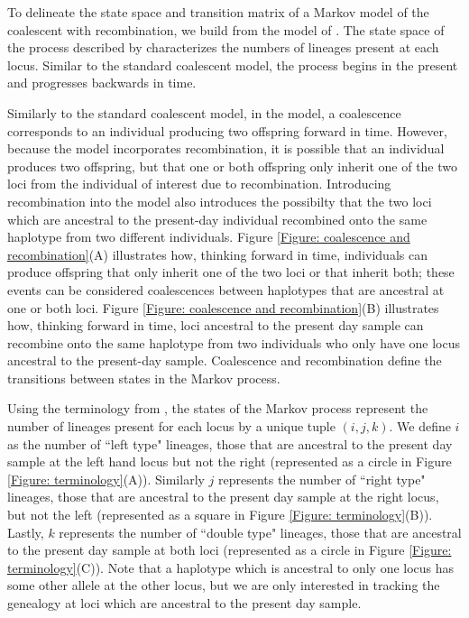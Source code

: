 \documentclass[11pt,oneside]{amsart}
\begin{document}
To delineate the state space and transition matrix of a Markov model of the coalescent with recombination, we build from the model of \cite{SimonsenChurchill1997}. The state space of the process described by \cite{SimonsenChurchill1997} characterizes the numbers of lineages present at each locus. Similar to the standard coalescent model, the process begins in the present and progresses backwards in time.

Similarly to the standard coalescent model, in the \cite{SimonsenChurchill1997} model, a coalescence corresponds to an individual producing two offspring forward in time. However, because the model incorporates recombination, it is possible that an individual produces two offspring, but that one or both offspring only inherit one of the two loci from the individual of interest due to recombination. Introducing recombination into the model also introduces the possibilty that the two loci which are ancestral to the present-day individual recombined onto the same haplotype from two different individuals. Figure \ref{Figure: coalescence and recombination}(A) illustrates how, thinking forward in time, individuals can produce offspring that only inherit one of the two loci or that inherit both; these events can be considered coalescences between haplotypes that are ancestral at one or both loci. Figure \ref{Figure: coalescence and recombination}(B) illustrates how, thinking forward in time, loci ancestral to the present day sample can recombine onto the same haplotype from two individuals who only have one locus ancestral to the present-day sample. Coalescence and recombination define the transitions between states in the Markov process.


Using the terminology from \cite{SimonsenChurchill1997}, the states of the Markov process represent the number of lineages present for each locus by a unique tuple $(i, j, k)$. We define $i$ as the number of ``left type" lineages, those that are ancestral to the present day sample at the left hand locus but not the right (represented as a circle in Figure \ref{Figure: terminology}(A)). Similarly $j$ represents the number of ``right type" lineages, those that are ancestral to the present day sample at the right locus, but not the left (represented as a square in Figure \ref{Figure: terminology}(B)). Lastly, $k$ represents the number of ``double type" lineages, those that are ancestral to the present day sample at both loci (represented as a circle in Figure \ref{Figure: terminology}(C)). Note that a haplotype which is ancestral to only one locus has some other allele at the other locus, but we are only interested in tracking the genealogy at loci which are ancestral to the present day sample.
\end{document}
